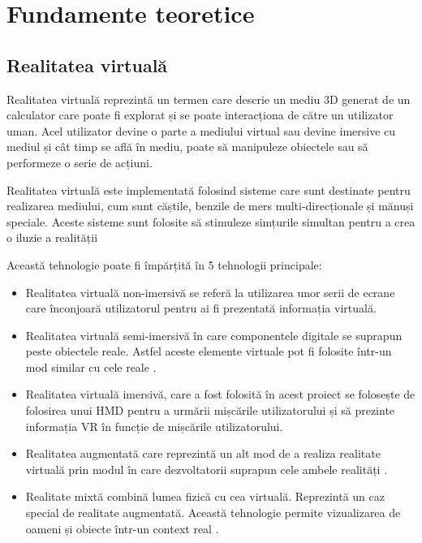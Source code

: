 \clearpage




\setcounter{page}{5}
\section{Fundamente teoretice}
\subsection{Realitatea virtuală}
Realitatea virtuală reprezintă un termen care descrie un mediu 3D generat de un calculator care poate fi explorat și se poate interacționa de către un utilizator uman. Acel utilizator devine o parte a mediului virtual sau devine imersive cu mediul și cât timp se află în mediu, poate să manipuleze obiectele sau să performeze o serie de acțiuni.

Realitatea virtuală este implementată folosind sisteme care sunt destinate pentru realizarea mediului, cum sunt căștile, benzile de mers multi-direcționale și mănuși speciale. Aceste sisteme sunt folosite să stimuleze simțurile simultan pentru a crea o iluzie a realității


Această tehnologie poate fi împărțită în 5 tehnologii principale: 
\begin{itemize}
	\item Realitatea virtuală non-imersivă se referă la utilizarea unor serii de ecrane care înconjoară utilizatorul pentru ai fi prezentată informația virtuală\cite{vr}.
	
	\item Realitatea virtuală semi-imersivă în care componentele digitale se suprapun peste obiectele reale. Astfel aceste elemente virtuale pot fi folosite într-un mod similar cu cele reale \cite{vr3}.
	
	\item Realitatea virtuală imersivă, care a fost folosită în acest proiect se folosește de folosirea unui HMD pentru a urmării mișcările utilizatorului și să prezinte informația VR în funcție de mișcările utilizatorului\cite{vr}.
	
	\item Realitatea augmentată care reprezintă un alt mod de a realiza realitate virtuală prin modul în care dezvoltatorii suprapun cele ambele realități \cite{vr3}.
	
	\item Realitate mixtă combină lumea fizică cu cea virtuală. Reprezintă un caz special de realitate augmentată. Această tehnologie permite vizualizarea de oameni și obiecte într-un context real \cite{vr3}.
\end{itemize}







